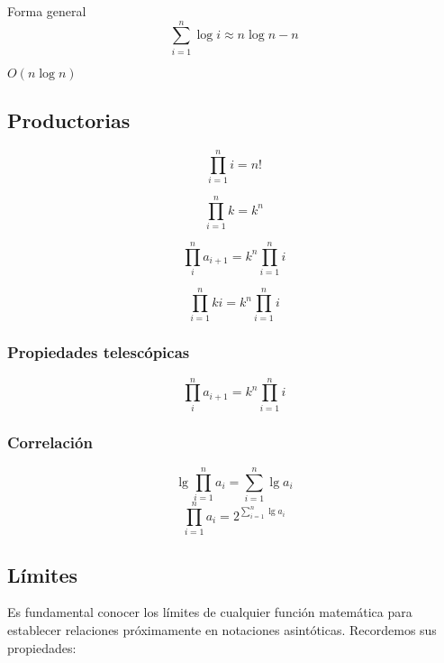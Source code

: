 \begin{definition}[Logarítmica]
	Forma general
	$$ \sum_{i=1}^n\log i \approx
		n\log n-n$$
	\begin{fact}[Orden]
		$O(n\log n)$
	\end{fact}
\end{definition}

\subsection{Productorias}

\begin{definition}[Factorial]
	$$
		\prod_{i=1}^ni
		=n!
	$$
\end{definition}

\begin{definition}[Constante]
	$$
		\prod_{i=1}^nk
		=k^n
	$$
\end{definition}

\begin{definition}[Generalizada]
	$$
		\prod_{i}^n a_{i+1}
		=k^n\prod_{i=1}^ni
	$$
\end{definition}

\begin{definition}[Escalar]
	$$
		\prod_{i=1}^nki
		=k^n\prod_{i=1}^ni
	$$
\end{definition}

\subsubsection{Propiedades telescópicas}

\begin{definition}[Generalizada]
	$$
		\prod_{i}^n a_{i+1}
		=k^n\prod_{i=1}^ni
	$$
\end{definition}

\subsubsection{Correlación}
\begin{definition}
	$$
		\lg \prod_{i=1}^n a_i
		= \sum_{i=1}^n\lg a_i
	$$
	$$
		\prod_{i=1}^n a_i
		= 2^{\sum_{i=1}^n\lg a_i}
	$$
\end{definition}

\subsection{Límites}
Es fundamental conocer los límites de cualquier función matemática para establecer relaciones próximamente en notaciones asintóticas. Recordemos sus propiedades:

